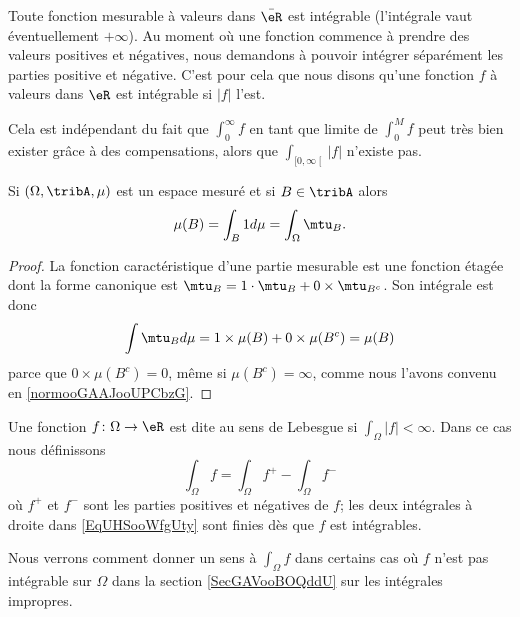 \begin{remark}
    Toute fonction mesurable à valeurs dans \( \bar \eR\) est intégrable (l'intégrale vaut éventuellement \( +\infty\)). Au moment où une fonction commence à prendre des valeurs positives et négatives, nous demandons à pouvoir intégrer séparément les parties positive et négative. C'est pour cela que nous disons qu'une fonction \( f\) à valeurs dans \( \eR\) est intégrable si \( | f |\) l'est.

    Cela est indépendant du fait que \( \int_0^{\infty}f\) en tant que limite de \( \int_0^{M}f\) peut très bien exister grâce à des compensations, alors que \( \int_{\mathopen[ 0 , \infty \mathclose[}| f |\) n'existe pas.
\end{remark}

\begin{lemma}       \label{LemooPJLNooVKrBhN}
    Si \( (\Omega,\tribA,\mu)\) est un espace mesuré et si \( B\in \tribA\) alors
    \begin{equation}
        \mu(B)=\int_B1d\mu=\int_{\Omega}\mtu_B.
    \end{equation}
\end{lemma}

\begin{proof}
    La fonction caractéristique d'une partie mesurable est une fonction étagée dont la forme canonique est \( \mtu_B=1\cdot \mtu_B+0\times \mtu_{B^c}\). Son intégrale est donc
    \begin{equation}
        \int\mtu_Bd\mu=1\times \mu(B)+0\times \mu(B^c)=\mu(B)
    \end{equation}
    parce que \( 0\times \mu(B^c)=0\), même si \( \mu(B^c)=\infty\), comme nous l'avons convenu en \ref{normooGAAJooUPCbzG}.
\end{proof}

\begin{definition}  \label{DefTCXooAstMYl}
    Une fonction \( f\colon \Omega\to \eR\) est dite  au sens de Lebesgue si \( \int_{\Omega}| f |<\infty\). Dans ce cas nous définissons
    \begin{equation}    \label{EqUHSooWfgUty}
        \int_{\Omega}f=\int_{\Omega}f^+-\int_{\Omega}f^-
    \end{equation}
    où \( f^+\) et \( f^-\) sont les parties positives et négatives de \( f\); les deux intégrales à droite dans \eqref{EqUHSooWfgUty} sont finies dès que \( f\) est intégrables.
\end{definition}
Nous verrons comment donner un sens à \( \int_{\Omega}f\) dans certains cas où \( f\) n'est pas intégrable sur \( \Omega\) dans la section \ref{SecGAVooBOQddU} sur les intégrales impropres.

